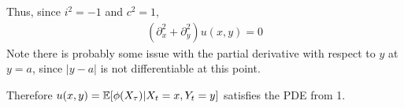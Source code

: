 \documentclass[10pt]{article}
\begin{document}
\begin{solution}[Solution]
\begin{enumerate}
        Thus, since \( i^2 = -1  \) and \( c^2 = 1 \),
        \begin{align*}
            (\partial_x^2+\partial_y^2)u(x,y) = 0
        \end{align*}
        Note there is probably some issue with the partial derivative with respect to \( y \) at \( y=a \), since \( |y-a| \) is not differentiable at this point.

        Therefore \( u(x,y) = \mathbb{E}[\phi(X_\tau) | X_t = x, Y_t = y] \) satisfies the PDE from 1.
\end{enumerate}

\end{solution}
\end{document}
